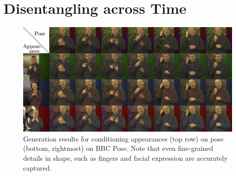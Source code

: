 \section{Disentangling across Time}\label{sec:videotovideo}
	\begin{figure}[htp]
		\centering
		\includegraphics[trim={0cm 0cm 0cm 0cm},clip, width=1.\linewidth]{fig/factor/bbc_arrange}
		\caption{Generation results for conditioning appearances (top row) on pose (bottom, rightmost) on BBC Pose.
		Note that even fine-grained details in shape, such as fingers and facial expression are accurately captured.}
		\label{fig:bbcthumb}
	\end{figure}



